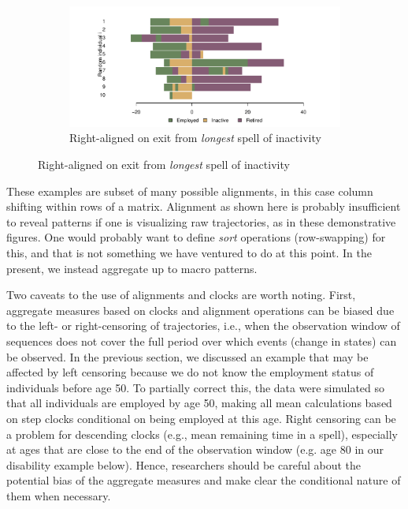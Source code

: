 \documentclass{article}
\begin{document}
\begin{figure}[ht!]
\begin{subfigure}{\textwidth}
\centering
\caption{Right-aligned on exit from \emph{longest} spell of inactivity}
\label{fig:longinactright}
\includegraphics[scale=.5]{Figures/Seq10inactlongright.pdf}
\end{subfigure}

\end{figure}

These examples are subset of many possible alignments, in this case column shifting within rows of a matrix. Alignment as shown here is probably insufficient to reveal patterns if one is visualizing raw trajectories, as in these demonstrative figures. One would probably want to define \emph{sort} operations (row-swapping) for this, and that is not something we have ventured to do at this point. In the present, we instead aggregate up to macro patterns.

Two caveats to the use of alignments and clocks are worth noting. First, aggregate measures based on clocks and alignment operations can be biased due to the left- or right-censoring of trajectories, i.e., when the observation window of sequences does not cover the full period over which events (change in states) can be observed. In the previous section, we discussed an example that may be affected by left censoring because we do not know the employment status of individuals before age 50. To partially correct this, the data were simulated so that all individuals are employed by age 50, making all mean calculations based on step clocks conditional on being employed at this age. Right censoring can be a problem for descending clocks (e.g., mean remaining time in a spell), especially at ages that are close to the end of the observation window (e.g. age 80 in our disability example below). Hence, researchers should be careful about the potential bias of the aggregate measures and make clear the conditional nature of them when necessary.
\end{document}
